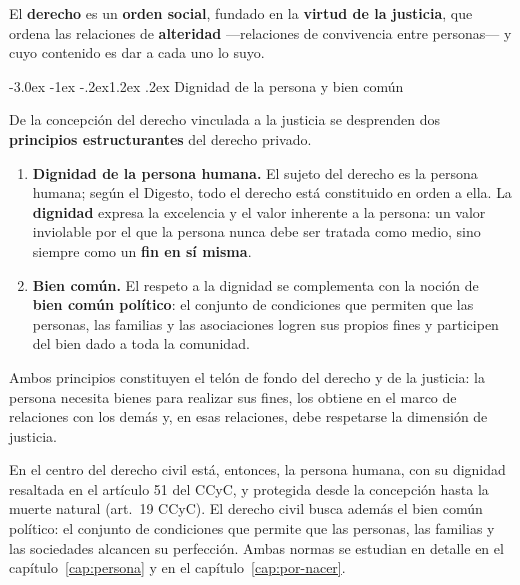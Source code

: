 \documentclass[12pt,oneside]{book}
\makeatletter
\renewcommand\section{\@startsection{section}{1}{\z@}%
  {-3.0ex \@plus -1ex \@minus -.2ex}{1.2ex \@plus .2ex}%
  {\normalfont\large\bfseries\color{acento}}}
\makeatother
\begin{document}
\begin{definicion}
El \textbf{derecho} es un \textbf{orden social}, fundado en la \textbf{virtud de la justicia}, que ordena las relaciones de \textbf{alteridad} ---relaciones de convivencia entre personas--- y cuyo contenido es dar a cada uno lo suyo.
\end{definicion}

\section{Dignidad de la persona y bien común}
\label{sec:dignidad-bien-comun}

De la concepción del derecho vinculada a la justicia se desprenden dos \textbf{principios estructurantes} del derecho privado.

\begin{importante}
\begin{enumerate}
\item \textbf{Dignidad de la persona humana.} El sujeto del derecho es la persona humana; según el Digesto, todo el derecho está constituido en orden a ella. La \textbf{dignidad} expresa la excelencia y el valor inherente a la persona: un valor inviolable por el que la persona nunca debe ser tratada como medio, sino siempre como un \textbf{fin en sí misma}.
\item \textbf{Bien común.} El respeto a la dignidad se complementa con la noción de \textbf{bien común político}: el conjunto de condiciones que permiten que las personas, las familias y las asociaciones logren sus propios fines y participen del bien dado a toda la comunidad.
\end{enumerate}
\end{importante}

Ambos principios constituyen el telón de fondo del derecho y de la justicia: la persona necesita bienes para realizar sus fines, los obtiene en el marco de relaciones con los demás y, en esas relaciones, debe respetarse la dimensión de justicia.

En el centro del derecho civil está, entonces, la persona humana, con su dignidad resaltada en el artículo 51 del CCyC, y protegida desde la concepción hasta la muerte natural (art.~19 CCyC). El derecho civil busca además el bien común político: el conjunto de condiciones que permite que las personas, las familias y las sociedades alcancen su perfección. Ambas normas se estudian en detalle en el capítulo~\ref{cap:persona} y en el capítulo~\ref{cap:por-nacer}.
\end{document}
